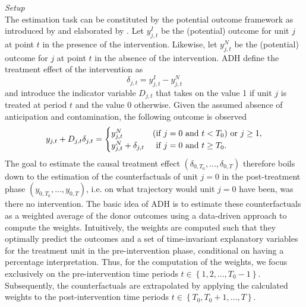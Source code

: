 \textit{Setup} \\
The estimation task can be constituted by the potential outcome framework as introduced by \cite{neyman:1923} and elaborated by \cite{rubin:1974}. Let $y^{I}_{j,t}$ be the (potential) outcome for unit $j$ at point $t$ in the presence of the intervention. Likewise, let $y^{N}_{j,t}$ be the (potential) outcome for $j$ at point $t$ in the absence of the intervention. \ac{ADH} define the treatment effect of the intervention as 
\[
\delta_{j,t} = y^{I}_{j,t} - y^{N}_{j,t}
\] 
and introduce the indicator variable $D_{j,t}$ that takes on the value 1 if unit $j$ is treated at period $t$ and the value 0 otherwise. Given the assumed absence of anticipation and contamination, the following outcome is observed
\[
y_{j,t} + D_{j,t} \delta_{j,t} = 
\begin{cases}
	y^{N}_{j,t} &\text{(if } j = 0 \text{ and } t < T_0\text{)} \text{ or } j \geq 1, \\
	y^{N}_{j,t} + \delta_{j,t} &  \text{\phantom{(}if } j = 0 \text{ and } t \geq T_0.
\end{cases}
\] 
The goal to estimate the causal treatment effect $(\delta_{0,T_0}, ..., \delta_{0,T})$ therefore boils down to the estimation of the counterfactuals of unit $j = 0$ in the post-treatment phase $(y_{0,T_0}, ..., y_{0,T})$, i.e. on what trajectory would unit $j=0$ have been, was there no intervention. The basic idea of \ac{ADH} is to estimate these counterfactuals as a weighted average of the donor outcomes using a data-driven approach to compute the weights. 
Intuitively, the weights are computed such that they optimally predict the outcomes and a set of time-invariant explanatory variables for the treatment unit in the pre-intervention phase, conditional on having a percentage interpretation. Thus, for the computation of the weights, we focus exclusively on the pre-intervention time periods $t \in \left\lbrace 1,2, ..., T_{0}-1\right\rbrace $. Subsequently, the counterfactuals are extrapolated by applying the calculated weights to the post-intervention time periods $t \in \left\lbrace T_{0},T_{0}+1, ..., T\right\rbrace $.

